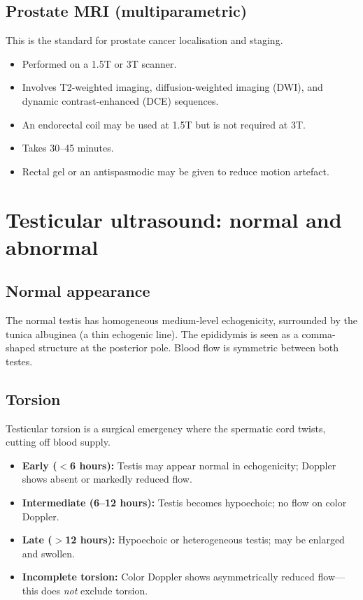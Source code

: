 \subsection{Prostate MRI (multiparametric)}
This is the standard for prostate cancer localisation and staging.
\begin{itemize}
    \item Performed on a 1.5T or 3T scanner.
    \item Involves T2-weighted imaging, diffusion-weighted imaging (DWI), and dynamic contrast-enhanced (DCE) sequences.
    \item An endorectal coil may be used at 1.5T but is not required at 3T.
    \item Takes 30--45 minutes.
    \item Rectal gel or an antispasmodic may be given to reduce motion artefact.
\end{itemize}

\section{Testicular ultrasound: normal and abnormal}

\subsection{Normal appearance}
The normal testis has homogeneous medium-level echogenicity, surrounded by the tunica albuginea (a thin echogenic line). The epididymis is seen as a comma-shaped structure at the posterior pole. Blood flow is symmetric between both testes.

\subsection{Torsion}
Testicular torsion is a surgical emergency where the spermatic cord twists, cutting off blood supply.
\begin{itemize}
    \item \textbf{Early ($<$6 hours):} Testis may appear normal in echogenicity; Doppler shows absent or markedly reduced flow.
    \item \textbf{Intermediate (6--12 hours):} Testis becomes hypoechoic; no flow on color Doppler.
    \item \textbf{Late ($>$12 hours):} Hypoechoic or heterogeneous testis; may be enlarged and swollen.
    \item \textbf{Incomplete torsion:} Color Doppler shows asymmetrically reduced flow---this does \emph{not} exclude torsion.
\end{itemize}

